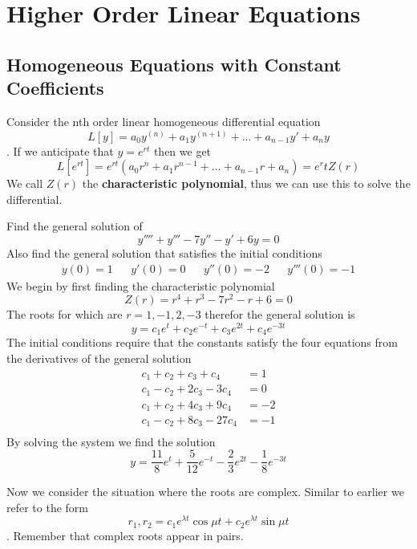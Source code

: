 \chapter{Higher Order Linear Equations}
\section{Homogeneous Equations with Constant Coefficients}
Consider the nth order linear homogeneous differential equation \[ L[y] = a_0 y^{(n)} + a_1 y^{(n+1)} + ... +  a_{n-1} y' + a_n y\]. If we anticipate that $ y = e^{rt} $ then we get \[ L[e^{rt}] = e^{rt}(a_0r^n+a_1r^{n-1}+...+a_{n-1}r + a_n) = e^rt Z(r) \] We call $ Z(r) $ the \textbf{characteristic polynomial}, thus we can use this to solve the differential. 
\begin{example}
	Find the general solution of \[ y'''' + y''' - 7y'' - y' + 6y = 0 \]
	Also find the general solution that satisfies the initial conditions 
	\begin{align*}
	y(0)=1 && y'(0) = 0 && y''(0) = -2 && y'''(0) = -1
	\end{align*}
	We begin by first finding the characteristic polynomial 
	\[ Z(r) = r^4 + r^3 - 7r^2 - r + 6 = 0 \]
	The roots for which are $ r = 1, -1, 2, -3 $ therefor the general solution is 
	\[ y = c_1 e^t + c_2e^{-t}+ c_3 e ^{2t} + c_4 e ^{-3t}\]
	The initial conditions require that the constants satisfy the four equations from the derivatives of the general solution 
	\begin{align*}
	c_1 + c_2 + c_3 + c_4 &= 1 \\
	c_1 - c_2 + 2c_3 - 3c_4 &= 0 \\
	c_1 + c_2 + 4c_3 + 9c_4 &= -2 \\
	c_1 - c_2 + 8c_3 - 27c_4 &= -1 \\
	\end{align*}
	By solving the system we find the solution 
	\[ y = \dfrac{11}{8}e^t + \dfrac{5}{12}e^{-t} - \dfrac{2}{3}e^{2t} - \dfrac{1}{8}e^{-3t} \]
\end{example}
	Now we consider the situation where the roots are complex. Similar to earlier we refer to the form \[ r_1, r_2 = c_1e^{\lambda t} \cos \mu t + c_2e^{\lambda t} \sin \mu t\]. Remember that complex roots appear in pairs.
